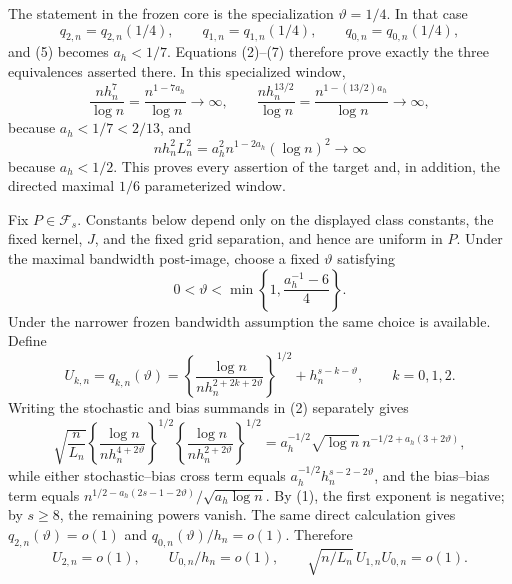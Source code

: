 The statement in the frozen core is the specialization \(\vartheta=1/4\).  In that case
\[
 q_{2,n}=q_{2,n}(1/4),\qquad
 q_{1,n}=q_{1,n}(1/4),\qquad
 q_{0,n}=q_{0,n}(1/4),
\]
and (5) becomes \(a_h<1/7\).  Equations (2)--(7) therefore prove exactly the three equivalences asserted there.  In this specialized window,
\[
 \frac{n h_n^7}{\log n}
 =\frac{n^{1-7a_h}}{\log n}\to\infty,
 \qquad
 \frac{n h_n^{13/2}}{\log n}
 =\frac{n^{1-(13/2)a_h}}{\log n}\to\infty,
\tag{11}
\]
because \(a_h<1/7<2/13\), and
\[
 n h_n^2L_n^2
 =a_h^2n^{1-2a_h}(\log n)^2\to\infty
\tag{12}
\]
because \(a_h<1/2\).  This proves every assertion of the target and, in addition, the directed maximal \(1/6\) parameterized window.

Fix \(P\in\mathcal F_s\).  Constants below depend only on the displayed class constants, the fixed kernel, \(J\), and the fixed grid separation, and hence are uniform in \(P\).  Under the maximal bandwidth post-image, choose a fixed \(\vartheta\) satisfying
\[
 0<\vartheta<\min\left\{1,\frac{a_h^{-1}-6}{4}\right\}.
\tag{1}
\]
Under the narrower frozen bandwidth assumption the same choice is available.  Define
\[
 U_{k,n}=q_{k,n}(\vartheta)
 =\left\{\frac{\log n}{n h_n^{2+2k+2\vartheta}}\right\}^{1/2}
  +h_n^{s-k-\vartheta},\qquad k=0,1,2.
\tag{2}
\]
Writing the stochastic and bias summands in (2) separately gives
\[
 \sqrt{\frac n{L_n}}
 \left\{\frac{\log n}{n h_n^{4+2\vartheta}}\right\}^{1/2}
 \left\{\frac{\log n}{n h_n^{2+2\vartheta}}\right\}^{1/2}
 =a_h^{-1/2}\sqrt{\log n}\,
   n^{-1/2+a_h(3+2\vartheta)},
\]
while either stochastic--bias cross term equals
\(a_h^{-1/2}h_n^{s-2-2\vartheta}\), and the bias--bias term equals
\(n^{1/2-a_h(2s-1-2\vartheta)}/\sqrt{a_h\log n}\).
By (1), the first exponent is negative; by \(s\geq8\), the remaining powers vanish.  The same direct calculation gives
\(q_{2,n}(\vartheta)=o(1)\) and
\(q_{0,n}(\vartheta)/h_n=o(1)\).  Therefore
\[
 U_{2,n}=o(1),\qquad U_{0,n}/h_n=o(1),
 \qquad \sqrt{n/L_n}\,U_{1,n}U_{0,n}=o(1).
\tag{3}
\]


